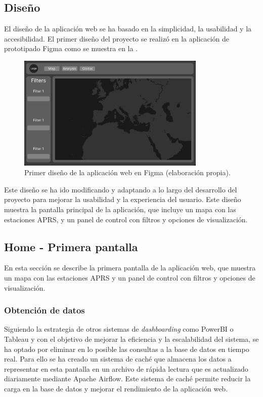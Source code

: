 \subsection{Diseño}
El diseño de la aplicación web se ha basado en la simplicidad, la usabilidad y la accesibilidad. El primer diseño del proyecto se realizó en la aplicación de prototipado Figma como se muestra en la .

\begin{figure}[h]
	\centering
	\includegraphics[width=0.8\textwidth]{Imagenes/Chapter_4/first_draft.png}
	\caption[Primer diseño de la aplicación web en Figma.]{Primer diseño de la aplicación web en Figma (elaboración propia).}
	\label{fig:figma}
\end{figure}

\noindent Este diseño se ha ido modificando y adaptando a lo largo del desarrollo del proyecto para mejorar la usabilidad y la experiencia del usuario. Este diseño muestra la pantalla principal de la aplicación, que incluye un mapa con las estaciones APRS, y un panel de control con filtros y opciones de visualización.

\subsection{Home - Primera pantalla}
En esta sección se describe la primera pantalla de la aplicación web, que muestra un mapa con las estaciones APRS y un panel de control con filtros y opciones de visualización.

\subsubsection*{Obtención de datos}

Siguiendo la estrategia de otros sistemas de \textit{dashboarding} como PowerBI o Tableau y con el objetivo de mejorar la eficiencia y la escalabilidad del sistema, se ha optado por eliminar en lo posible las consultas a la base de datos en tiempo real. Para ello se ha creado un sistema de caché que almacena los datos a representar en esta pantalla en un archivo de rápida lectura que es actualizado diariamente mediante Apache Airflow. Este sistema de caché permite reducir la carga en la base de datos y mejorar el rendimiento de la aplicación web.

